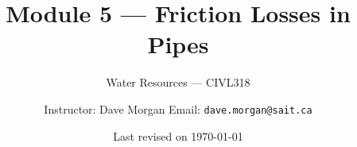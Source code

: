 \documentclass[9pt,xcolor=x11names,professionalfonts, mathserif]{beamer}
\begin{document}
\title[Friction]{Module 5 --- Friction Losses in Pipes}
\subtitle[CIVL318]{Water Resources --- CIVL318}
\author{Instructor: Dave Morgan
	\newline Email: \texttt{dave.morgan@sait.ca}
}
\date{\tiny \textcolor{blueGrey}{Last revised on \today}}


\begin{frame}[plain]    %
	\titlepage
\end{frame}

\end{document}
